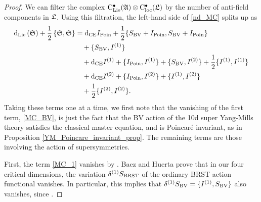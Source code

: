 \documentclass[10pt, oneside]{article}
\begin{document}
\begin{proof}
We can filter the complex ${\rm C}_{\rm Lie}^\bullet(\mathfrak{A}) \otimes {\rm C}_{\rm loc}^\bullet(\mathfrak L)$ by the number of anti-field components in $\mathfrak L$.  Using this filtration, the left-hand side of \ref{nd_MC} splits up as
\begin{align}
{\rm d}_{\rm Lie}  \left( \mathfrak S \right) + \frac{1}{2} \left\{ \mathfrak S , \mathfrak S \right\} &= {\rm d}_{\mathrm{CE}} I_{\mathrm{Poin}} + \frac 12 \{S_{\mathrm{BV}} + I_{\mathrm{Poin}}, S_{\mathrm{BV}} + I_{\mathrm{Poin}}\} \label{MC_BV}\\
&\quad + \{S_{\mathrm{BV}}, I^{(1)}\} \label{MC_1}\\
&\quad + {\rm d}_{\mathrm{CE}} I^{(1)} + \{I_{\mathrm{Poin}}, I^{(1)}\} + \{S_{\mathrm{BV}}, I^{(2)}\} + \frac 12 \{I^{(1)}, I^{(1)}\} \label{MC_2}\\
&\quad + {\rm d}_{\mathrm{CE}} I^{(2)} + \{I_{\mathrm{Poin}}, I^{(2)}\} + \{I^{(1)}, I^{(2)}\} \label{MC_3}\\
&\quad + \frac 12 \{I^{(2)}, I^{(2)}\}. \label{MC_4}
\end{align}
Taking these terms one at a time, we first note that the vanishing of the first term, \ref{MC_BV}, is just the fact that the BV action of the 10d super Yang-Mills theory satisfies the classical master equation, and is Poincar\'e invariant, as in Proposition \ref{YM_Poincare_invariant_prop}. The remaining terms are those involving the action of supersymmetries.

First, the term \ref{MC_1} vanishes by \cite[Proposition 14]{BaezHuerta}.  Baez and Huerta prove that in our four critical dimensions, the variation $\delta^{(1)}S_{\mathrm{BRST}}$ of the ordinary BRST action functional vanishes.  In particular, this implies that $\delta^{(1)}S_{\mathrm{BV}} = \{I^{(1)}, S_{\mathrm{BV}}\}$ also vanishes, since .


\end{proof}
\end{document}
